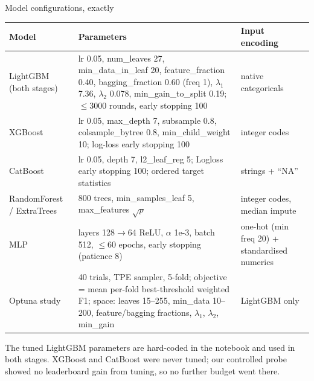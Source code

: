 \documentclass[aspectratio=169,10pt]{beamer}
\begin{document}
\begin{frame}{Model configurations, exactly}
  \scriptsize
  \begin{tabular}{@{}p{2.2cm}p{7.6cm}p{2.9cm}@{}}
    \toprule
    \textbf{Model} & \textbf{Parameters} & \textbf{Input encoding}\\
    \midrule
    LightGBM (both stages) & lr 0.05, num\_leaves 27, min\_data\_in\_leaf 20, feature\_fraction 0.40, bagging\_fraction 0.60 (freq 1),
      $\lambda_1$ 7.36, $\lambda_2$ 0.078, min\_gain\_to\_split 0.19; $\le 3000$ rounds, early stopping 100 & native categoricals\\
    XGBoost & lr 0.05, max\_depth 7, subsample 0.8, colsample\_bytree 0.8, min\_child\_weight 10; log-loss early stopping 100 & integer codes\\
    CatBoost & lr 0.05, depth 7, l2\_leaf\_reg 5; Logloss early stopping 100; ordered target statistics & strings + ``NA''\\
    RandomForest / ExtraTrees & 800 trees, min\_samples\_leaf 5, max\_features $\sqrt{p}$ & integer codes, median impute\\
    MLP & layers 128$\to$64 ReLU, $\alpha$ 1e-3, batch 512, $\le 60$ epochs, early stopping (patience 8) & one-hot (min freq 20) + standardised numerics\\
    \midrule
    Optuna study & 40 trials, TPE sampler, 5-fold; objective = mean per-fold best-threshold weighted F1;
      space: leaves 15--255, min\_data 10--200, feature/bagging fractions, $\lambda_1$, $\lambda_2$, min\_gain & LightGBM only\\
    \bottomrule
  \end{tabular}
  \vspace{5pt}\par\tiny\color{mutedgray}
  The tuned LightGBM parameters are hard-coded in the notebook and used in both stages. XGBoost and CatBoost were never tuned;
  our controlled probe showed no leaderboard gain from tuning, so no further budget went there.
\end{frame}
\end{document}
